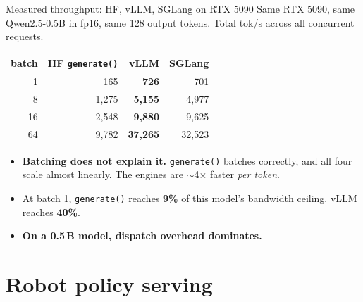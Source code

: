 \documentclass[aspectratio=169,10pt]{beamer}
\newcommand{\emphc}[1]{\textcolor{accent}{\textbf{#1}}}
\begin{document}

\begin{frame}{Measured throughput: HF, vLLM, SGLang on RTX 5090}
  \small
  Same RTX 5090, same Qwen2.5-0.5B in fp16, same 128 output tokens.
  Total tok/s across all concurrent requests.
  \vspace{0.4em}
  \begin{center}
    \begin{tabular}{rrrr}
      \toprule
      \textbf{batch} & \textbf{HF \texttt{generate()}} & \textbf{vLLM} &
      \textbf{SGLang} \\
      \midrule
      1  & 165   & \textbf{726}    & 701 \\
      8  & 1,275 & \textbf{5,155}  & 4,977 \\
      16 & 2,548 & \textbf{9,880}  & 9,625 \\
      64 & 9,782 & \textbf{37,265} & 32,523 \\
      \bottomrule
    \end{tabular}
  \end{center}
  \vspace{0.5em}
  \begin{itemize}\small
    \item \emphc{Batching does not explain it.} \texttt{generate()} batches correctly,
          and all four scale almost linearly. The engines are
          $\sim$4$\times$ faster \emph{per token}.
    \item At batch 1, \texttt{generate()} reaches \textbf{9\%} of this model's
          bandwidth ceiling. vLLM reaches \textbf{40\%}.
    \item \textbf{On a 0.5\,B model, dispatch overhead dominates.}
  \end{itemize}
\end{frame}



\section{Robot policy serving}
\end{document}
